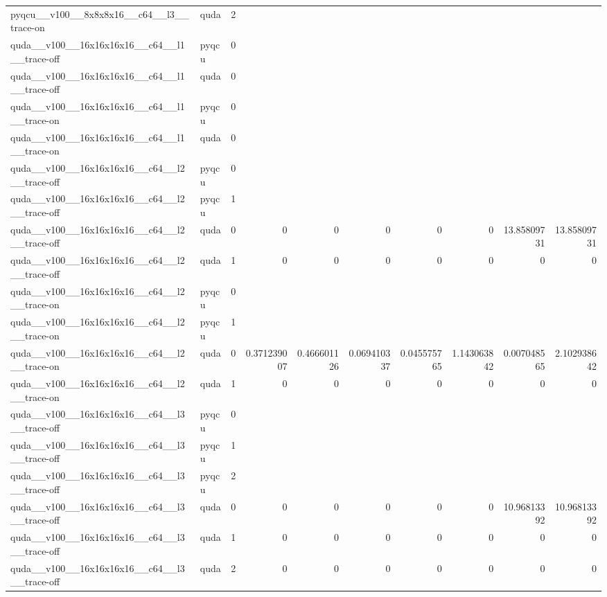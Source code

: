 \begin{table}[htbp]
\begin{tabular}{@{}llrrrrrrrr@{}}
pyqcu\_\_v100\_\_8x8x8x16\_\_c64\_\_l3\_\_trace-on & quda & 2 &  &  &  &  &  &  &  \\
quda\_\_v100\_\_16x16x16x16\_\_c64\_\_l1\_\_trace-off & pyqcu & 0 &  &  &  &  &  &  &  \\
quda\_\_v100\_\_16x16x16x16\_\_c64\_\_l1\_\_trace-off & quda & 0 &  &  &  &  &  &  &  \\
quda\_\_v100\_\_16x16x16x16\_\_c64\_\_l1\_\_trace-on & pyqcu & 0 &  &  &  &  &  &  &  \\
quda\_\_v100\_\_16x16x16x16\_\_c64\_\_l1\_\_trace-on & quda & 0 &  &  &  &  &  &  &  \\
quda\_\_v100\_\_16x16x16x16\_\_c64\_\_l2\_\_trace-off & pyqcu & 0 &  &  &  &  &  &  &  \\
quda\_\_v100\_\_16x16x16x16\_\_c64\_\_l2\_\_trace-off & pyqcu & 1 &  &  &  &  &  &  &  \\
quda\_\_v100\_\_16x16x16x16\_\_c64\_\_l2\_\_trace-off & quda & 0 & 0 & 0 & 0 & 0 & 0 & 13.85809731 & 13.85809731 \\
quda\_\_v100\_\_16x16x16x16\_\_c64\_\_l2\_\_trace-off & quda & 1 & 0 & 0 & 0 & 0 & 0 & 0 & 0 \\
quda\_\_v100\_\_16x16x16x16\_\_c64\_\_l2\_\_trace-on & pyqcu & 0 &  &  &  &  &  &  &  \\
quda\_\_v100\_\_16x16x16x16\_\_c64\_\_l2\_\_trace-on & pyqcu & 1 &  &  &  &  &  &  &  \\
quda\_\_v100\_\_16x16x16x16\_\_c64\_\_l2\_\_trace-on & quda & 0 & 0.371239007 & 0.466601126 & 0.069410337 & 0.045575765 & 1.143063842 & 0.007048565 & 2.102938642 \\
quda\_\_v100\_\_16x16x16x16\_\_c64\_\_l2\_\_trace-on & quda & 1 & 0 & 0 & 0 & 0 & 0 & 0 & 0 \\
quda\_\_v100\_\_16x16x16x16\_\_c64\_\_l3\_\_trace-off & pyqcu & 0 &  &  &  &  &  &  &  \\
quda\_\_v100\_\_16x16x16x16\_\_c64\_\_l3\_\_trace-off & pyqcu & 1 &  &  &  &  &  &  &  \\
quda\_\_v100\_\_16x16x16x16\_\_c64\_\_l3\_\_trace-off & pyqcu & 2 &  &  &  &  &  &  &  \\
quda\_\_v100\_\_16x16x16x16\_\_c64\_\_l3\_\_trace-off & quda & 0 & 0 & 0 & 0 & 0 & 0 & 10.96813392 & 10.96813392 \\
quda\_\_v100\_\_16x16x16x16\_\_c64\_\_l3\_\_trace-off & quda & 1 & 0 & 0 & 0 & 0 & 0 & 0 & 0 \\
quda\_\_v100\_\_16x16x16x16\_\_c64\_\_l3\_\_trace-off & quda & 2 & 0 & 0 & 0 & 0 & 0 & 0 & 0 \\

\end{tabular}
\end{table}
